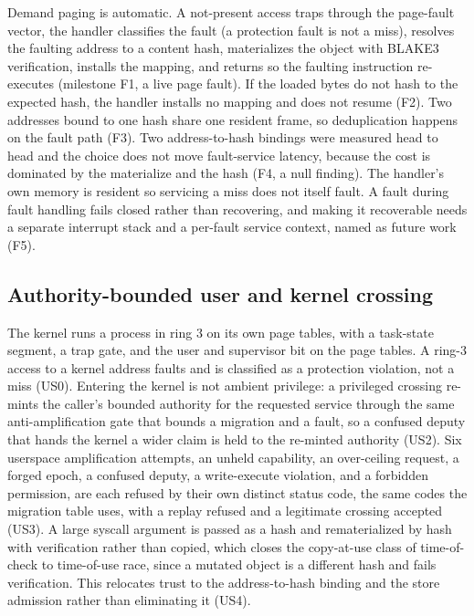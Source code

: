\documentclass[10pt,twocolumn]{article}
\begin{document}
Demand paging is automatic. A not-present access traps through the page-fault
vector, the handler classifies the fault (a protection fault is not a miss),
resolves the faulting address to a content hash, materializes the object with
BLAKE3 verification, installs the mapping, and returns so the faulting instruction
re-executes (milestone F1, a live page fault). If the loaded bytes do not hash to
the expected hash, the handler installs no mapping and does not resume (F2). Two
addresses bound to one hash share one resident frame, so deduplication happens on
the fault path (F3). Two address-to-hash bindings were measured head to head and
the choice does not move fault-service latency, because the cost is dominated by
the materialize and the hash (F4, a null finding). The handler's own memory is
resident so servicing a miss does not itself fault. A fault during fault handling
fails closed rather than recovering, and making it recoverable needs a separate
interrupt stack and a per-fault service context, named as future work (F5).

\subsection{Authority-bounded user and kernel crossing}

The kernel runs a process in ring 3 on its own page tables, with a task-state
segment, a trap gate, and the user and supervisor bit on the page tables. A
ring-3 access to a kernel address faults and is classified as a protection
violation, not a miss (US0). Entering the kernel is not ambient privilege: a
privileged crossing re-mints the caller's bounded authority for the requested
service through the same anti-amplification gate that bounds a migration and a
fault, so a confused deputy that hands the kernel a wider claim is held to the
re-minted authority (US2). Six userspace amplification attempts, an unheld
capability, an over-ceiling request, a forged epoch, a confused deputy, a
write-execute violation, and a forbidden permission, are each refused by their own
distinct status code, the same codes the migration table uses, with a replay
refused and a legitimate crossing accepted (US3). A large syscall argument is
passed as a hash and rematerialized by hash with verification rather than copied,
which closes the copy-at-use class of time-of-check to time-of-use race, since a
mutated object is a different hash and fails verification. This relocates trust to
the address-to-hash binding and the store admission rather than eliminating it
(US4).
\end{document}
